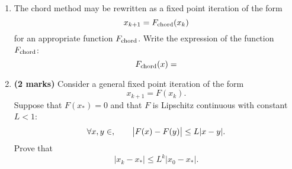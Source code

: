 \documentclass{article}
\begin{document}
\begin{enumerate}
    \item
        The chord method may be rewritten as a fixed point iteration of the form
        \[
            x_{k+1} = F_{\rm chord}(x_k)
        \]
        for an appropriate function $F_{\rm chord}$.
        Write the expression of the function $F_{\rm chord}$:
        \[
            F_{\rm chord} (x) =
        \]

    \item
        \textbf{(2 marks)}
        Consider a general fixed point iteration of the form
        \[
            x_{k+1} = F(x_k).
        \]
        Suppose that $F(x_*) = 0$
        and that $F$ is Lipschitz continuous with constant $L < 1$:
        \[
            \forall x, y \in \real, \qquad
            \bigl\lvert F(x) - F(y) \bigr\rvert
            \le L |x - y|.
        \]
        Prove that
        \[
            \lvert x_k - x_* \rvert \le
            L^k \lvert x_0 - x_* \rvert.
        \]
\end{enumerate}
\end{document}

